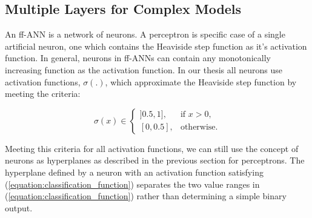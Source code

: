 \documentclass[letterpaper,12pt,titlepage,oneside,final]{book}
\begin{document}
	\subsection{Multiple Layers for Complex Models}
	
	An ff-ANN is a network of neurons. A perceptron is specific case of a single artificial neuron, one which contains the Heaviside step function as it's activation function. In general, neurons in ff-ANNs can contain any monotonically increasing function as the activation function. In our thesis all neurons use activation functions, $\sigma(.)$, which approximate the Heaviside step function by meeting the criteria:
	
	\begin{equation}
	\sigma(x) \in
	\begin{cases}
	]0.5,1] ,& \text{if } x > 0,\\
	[0,0.5],              & \text{otherwise}.
	\end{cases}
	\label{equation:classification_function}
	\end{equation}
	
	 Meeting this criteria for all activation functions, we can still use the concept of neurons as hyperplanes as described in the previous section for perceptrons. The hyperplane defined by a neuron with an activation function satisfying (\ref{equation:classification_function}) separates the two value ranges in (\ref{equation:classification_function}) rather than determining a simple binary output.
	 
\end{document}
